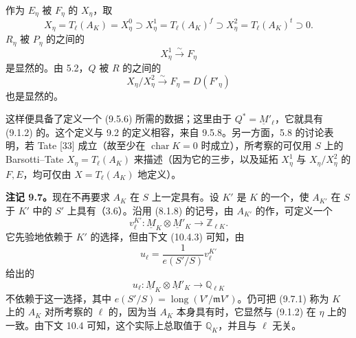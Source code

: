 作为 $E_\eta$ 被 $F_\eta$ 的 $X_\eta$，取
\begin{equation}\tag{9.6.2}
 X_\eta=T_\ell(A_K)=X_\eta^0\supset X_\eta^1=T_\ell(A_K)^f
 \supset X_\eta^2=T_\ell(A_K)^t\supset0.
\end{equation}
$R_\eta$ 被 $P_\eta$ 的之间的
\[
 X_\eta^1\xrightarrow{\sim}F_\eta
\]
是显然的。由 5.2，$Q$ 被 $R$ 的之间的
\[
 X_\eta/X_\eta^2\xrightarrow{\sim}F_\eta=D(F'_\eta)
\]
也是显然的。

这样便具备了定义一个 (9.5.6) 所需的数据；这里由于 $Q^*=\underline M'_\ell$，它就具有 (9.1.2) 的。这个定义与 9.2 的定义相容，来自 9.5.8。另一方面，5.8 的讨论表明，若 Tate  [33] 成立（故至少在 $\operatorname{char}K=0$ 时成立），所考察的可仅用 $S$ 上的 Barsotti--Tate  $X_\eta=T_\ell(A_K)$ 来描述（因为它的三步，以及延拓 $X_\eta^1$ 与 $X_\eta/X_\eta^2$ 的 $F,E$，均可仅由 $X=T_\ell(A_K)$ 地定义）。

\textbf{注记 9.7。}现在不再要求 $A_K$ 在 $S$ 上一定具有。设 $K'$ 是 $K$ 的一个，使 $A_{K'}$ 在 $S$ 于 $K'$ 中的 $S'$ 上具有（3.6）。沿用 (8.1.8) 的记号，由 $A_{K'}$ 的作，可定义一个
\begin{equation}\tag{*}
 v_\ell^{K'}:\underline M_K\otimes\underline M'_K\longrightarrow\mathbb Z_{\ell K}.
\end{equation}
它先验地依赖于 $K'$ 的选择，但由下文 (10.4.3) 可知，由
\[
 u_\ell=\frac1{e(S'/S)}v_\ell^{K'}
\]
给出的
\begin{equation}\tag{9.7.1}
 u_\ell:\underline M_K\otimes\underline M'_K\longrightarrow\mathbb Q_{\ell K}
\end{equation}
不依赖于这一选择，其中 $e(S'/S)=\operatorname{long}(V'/\mathfrak m V')$。仍可把 (9.7.1) 称为 $K$ 上的 $A_K$ 对所考察的 $\ell$ 的，因为当 $A_K$ 本身具有时，它显然与 (9.1.2) 在 $\eta$ 上的一致。由下文 10.4 可知，这个实际上总取值于 $\mathbb Q_K$，并且与 $\ell$ 无关。

